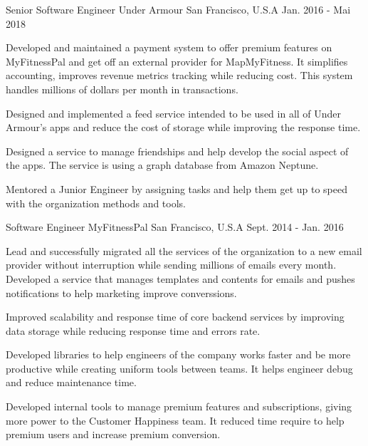 \begin{cventries}
  \cventry
    {Senior Software Engineer}
    {Under Armour}
    {San Francisco, U.S.A}
    {Jan. 2016 - Mai 2018}
    {
      \begin{cvitems}
	\item{Developed and maintained a payment system to offer premium features on MyFitnessPal and get off an external provider for MapMyFitness. It simplifies accounting, improves revenue metrics tracking while reducing cost. This system handles millions of dollars per month in transactions. }
	\item {Designed and implemented a feed service intended to be used in all of Under Armour's apps and reduce the cost of storage while improving the response time.}
        \item {Designed a service to manage friendships and help develop the social aspect of the apps. The service is using a graph database from Amazon Neptune. }	
	\item {Mentored a Junior Engineer by assigning tasks and help them get up to speed with the organization methods and tools.}
      \end{cvitems}
    }
    
  \cventry
    {Software Engineer}
    {MyFitnessPal}
    {San Francisco, U.S.A}
    {Sept. 2014 - Jan. 2016}
    {
      \begin{cvitems}	
        \item {Lead and successfully migrated all the services of the organization to a new email provider without interruption while sending millions of emails every month. Developed a service that manages templates and contents for emails and pushes notifications to help marketing improve converssions.}
        \item{Improved scalability and response time of core backend services by improving data storage while reducing response time and errors rate.}
        \item {Developed libraries to help engineers of the company works faster and be more productive while creating uniform tools between teams. It helps engineer debug and reduce maintenance time.}
        \item{Developed internal tools to manage premium features and subscriptions, giving more power to the Customer Happiness team. It reduced time require to help premium users and increase premium conversion.}
      \end{cvitems}
    }



\end{cventries}

